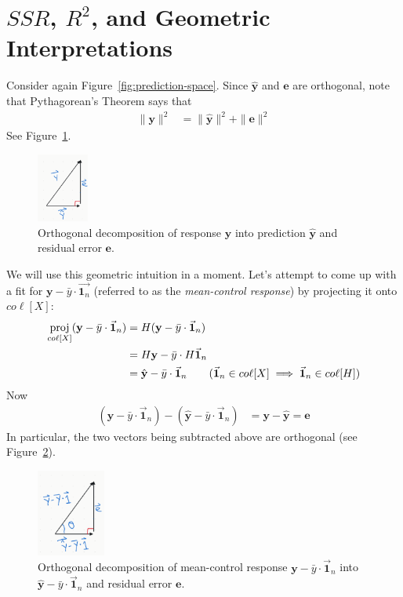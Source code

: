 \documentclass[12pt, a4paper]{article}
\theoremstyle{definition}
\begin{document}
	\section*{$SSR$, $R^2$, and Geometric Interpretations}
	Consider again Figure~\ref{fig:prediction-space}. Since $\hat{\mathbf{y}}$ and
	$\mathbf{e}$ are orthogonal, note that Pythagorean's Theorem says that
	\begin{align*}
		\|\mathbf{y}\|^2 &= \|\hat{\mathbf{y}}\|^2 + \|\mathbf{e}\|^2
	\end{align*}
	See Figure~\ref{fig:pyth-thm-y-yhat-e}.
	\begin{figure}
		\centering
		\includegraphics[width=0.15\textwidth]{pythagorean-theorem-y-yhat-e}
		\caption{Orthogonal decomposition of response $\mathbf{y}$ into prediction $\hat{\mathbf{y}}$ and
		residual error $\mathbf{e}$.}
		\label{fig:pyth-thm-y-yhat-e}
	\end{figure}
	We will use this geometric intuition in a moment.
	Let's attempt to come up with a fit for $\mathbf{y}-\bar{y}\cdot \vec{\mathbf{1}_n}$
	(referred to as the \textit{mean-control response}) by projecting it onto $co\ell[X]$:
	\begin{align*}
		\underset{co\ell[X]}{\text{proj}}(\mathbf{y}-\bar{y}\cdot \vec{\mathbf{1}}_n)
		&=H(\mathbf{y}-\bar{y}\cdot \vec{\mathbf{1}}_n)\\
		&=H\mathbf{y}-\bar{y}\cdot H\vec{\mathbf{1}}_n\\
		&=\hat{\mathbf{y}}-\bar{y} \cdot\vec{\mathbf{1}}_n
		\tag{$\vec{\mathbf{1}}_n\in co\ell[X]\implies \vec{\mathbf{1}}_n\in co\ell[H]$}
	\end{align*}
	Now
	\begin{align*}
		(\mathbf{y}-\bar{y}\cdot\vec{\mathbf{1}}_n) - (\hat{\mathbf{y}} - \bar{y}\cdot\vec{\mathbf{1}}_n)
		&=\mathbf{y}-\hat{\mathbf{y}}=\mathbf{e}
	\end{align*}
	In particular, the two vectors being subtracted above are orthogonal
	(see Figure~\ref{fig:pyth-thm-mean-control-response}).
	\begin{figure}
		\centering
		\includegraphics[width=0.2\textwidth]{pythagorean-theorem-mean-control-response}
		\caption{Orthogonal decomposition of mean-control response $\mathbf{y}-\bar{y}\cdot \vec{\mathbf{1}}_n$
		into $\hat{\mathbf{y}}-\bar{y}\cdot \vec{\mathbf{1}}_n$ and residual error $\mathbf{e}$.}
		\label{fig:pyth-thm-mean-control-response}
	\end{figure}
\end{document}
